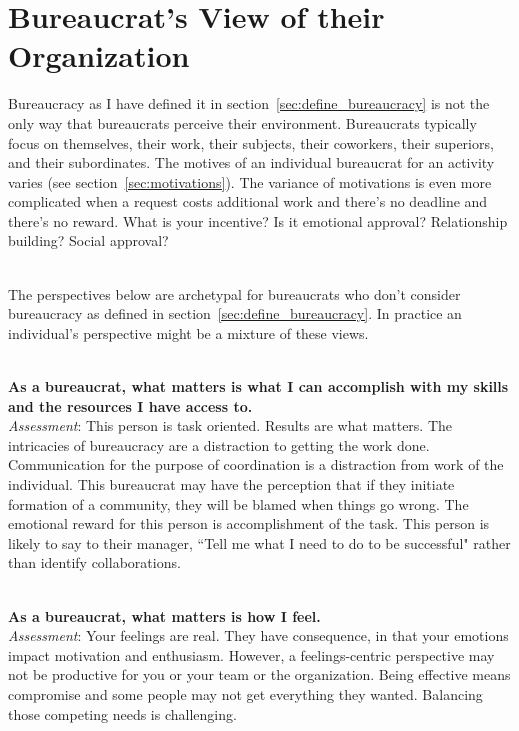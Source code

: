 \section{Bureaucrat's View of their Organization\label{sec:alternative_views_from_within}}

Bureaucracy as I have defined it in section~\ref{sec:define_bureaucracy} is not the only way that bureaucrats perceive their environment. Bureaucrats typically focus on themselves, their work, their subjects, their coworkers, their superiors, and their subordinates. The motives of an individual bureaucrat for an activity varies (see section~\ref{sec:motivations}). The variance of motivations is even more complicated when a request costs additional work and there's no deadline and there's no reward. What is your incentive? Is it emotional approval? Relationship building? Social approval?

\ \\

The perspectives below are archetypal for bureaucrats who don't consider bureaucracy as defined in section~\ref{sec:define_bureaucracy}. In practice an individual's perspective might be a mixture of these views.

\ \\
\textbf{As a bureaucrat, what matters is what I can accomplish with my skills and the resources I have access to.} \\
\textit{Assessment}: This person is task oriented. Results are what matters. The intricacies of bureaucracy are a distraction to getting the work done. 
Communication  for the purpose of coordination is a distraction from work of the individual. 
This bureaucrat may have the perception that if they initiate formation of a community, they will be blamed when things go wrong.
The emotional reward for this person is accomplishment of the task. This person is likely to say to their manager, ``Tell me what I need to do to be successful" rather than identify collaborations.

\ \\
\textbf{As a bureaucrat, what matters is how I feel.} \\
\textit{Assessment}: Your feelings are real. They have consequence, in that your emotions impact motivation and enthusiasm. However, a feelings-centric perspective may not be productive for you or your team or the organization. Being effective means compromise and some people may not get everything they wanted. Balancing those competing needs is challenging.


